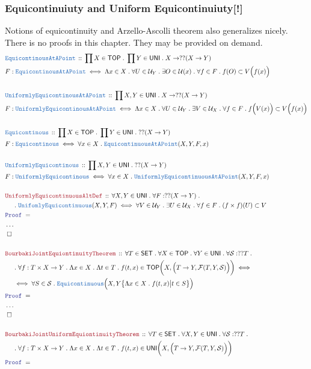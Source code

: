 \documentclass[12pt]{scrartcl}
\newcommand{\TYPE}[1]{\textcolor{NavyBlue}{\mathtt{#1}}}
\newcommand{\LOGIC}[1]{\textcolor{Blue}{\mathtt{#1}}}
\newcommand{\THM}[1]{\textcolor{Maroon}{\mathtt{#1}}}
\renewcommand{\.}{\; . \;}
\newcommand{\Theorem}[2]{& \THM{#1} \, :: \, #2 \\ & \Proof = \\ }
\newcommand{\DeclareType}[2]{& \TYPE{#1} \, :: \, #2 \\}
\newcommand{\DefineType}[3]{& #1 : \TYPE{#2} \iff #3 \\}
\newcommand{\NewLine}{\\ & \kern 1pc}
\newcommand{\Page}[1]{ \begin{align*} #1 \end{align*}   }
\newcommand{\NoProof}{ & \ldots \\ \EndProof}
\newcommand{\QED}{\; \square}
\newcommand{\EndProof}{& \QED \\}
\newcommand{\Proof}{\LOGIC{Proof} \; }
\newcommand{\SET}{\mathsf{SET}}
\newcommand{\TOP}{\mathsf{TOP}}
\renewcommand{\U}{\mathcal{U}}
\newcommand{\F}{\mathcal{F}}
\newcommand{\UNI}{\mathsf{UNI}}
\newcommand{\EqC}{\TYPE{Equicontinuous}}
\newcommand{\UEqC}{\TYPE{UnifomlyEquicontinuous}}
\begin{document}
\subsubsection{Equicontinuiuty and Uniform Equicontinuiuty[!]}
Notions of equicontinuity and Arzello-Ascolli theorem also generalizes nicely.
There is no proofs in this chapter. They may be provided on demand.
\Page{
	\DeclareType{EquicontinousAtAPoint}
	{
		\prod X \in \TOP \.
		\prod Y \in \UNI \.
		X 
		\to
		??(X \to Y)		
	}
	\DefineType{F}{EquicontinousAtAPoint}
	{
		\Lambda x \in X \. 
		\forall U \in \U_Y \. 
		\exists O \in \U(x) \.
		\forall  f \in F \.
		f(O) \subset V\Big(f(x)\Big)
	}
	\\
	\DeclareType{UniformlyEquicontinousAtAPoint}
	{
		\prod X,Y \in \UNI \.
		X 
		\to
		??(X \to Y)		
	}
	\DefineType{F}{UniformlyEquicontinousAtAPoint}
	{
		\Lambda x \in X \. 
		\forall U \in \U_Y \. 
		\exists V \in \U_X \.
		\forall  f \in F \.
		f\Big(V(x)\Big) \subset V\Big(f(x)\Big)
	}
	\\
	\DeclareType{Equicontinous}
	{
		\prod X \in \TOP \.
		\prod Y \in \UNI \.
		??(X \to Y)		
	}
	\DefineType{F}{Equicontinous}
	{
		\forall x \in X \.
		\TYPE{EquicontinuousAtAPoint}(X,Y,F,x)
	}
	\\
	\DeclareType{UniformlyEquicontinous}
	{
		\prod X,Y \in \UNI \. ??(X \to Y)		
	}
	\DefineType{F}{UniformlyEquicontinous}
	{
		\forall x \in X \.
		\TYPE{UniformlyEquicontinuousAtAPoint}(X,Y,F,x)
	}
	\\
	\Theorem{UniformlyEquicontinuousAltDef}
	{
		\forall  X,Y \in \UNI \.
		\forall F : ??(X \to Y) \. \NewLine \.
		\UEqC(X,Y,F)
		\iff
		\forall V \in \U_Y \.
		\exists U \in \U_X \.
		\forall f \in F \.
		(f \times f)(U) \subset V
	}
	\NoProof
	\\
	\Theorem{BourbakiJointEquiontinuityTheorem}
	{
		\forall T \in \SET \.
		\forall X \in \TOP \.
		\forall Y \in \UNI \.
		\forall \mathcal{S} : ??T \. \NewLine \.
		\forall f : T \times X \to Y \.
		\Lambda x \in X \. 
		\Lambda t \in T \. f(t,x)
		\in \TOP\bigg( X, \Big(T \to Y, \F(T,Y,\mathcal{S})\Big)   \bigg)
		\iff \NewLine \iff
		\forall S \in \mathcal{S} \.
		\EqC\Big(X,Y \big\{ \Lambda x \in X \. f(t,x)   \big| t \in S  \big\}   \Big)
	}
	\NoProof
	\\
	\Theorem{BourbakiJointUniformEquiontinuityTheorem}
	{
		\forall T \in \SET \.
		\forall X,Y \in \UNI \.
		\forall \mathcal{S} : ??T \. \NewLine \.
		\forall f : T \times X \to Y \.
		\Lambda x \in X \. 
		\Lambda t \in T \. f(t,x)
		\in \UNI\bigg( X, \Big(T \to Y, \F(T,Y,\mathcal{S})\Big)   \bigg)
}}
\end{document}
